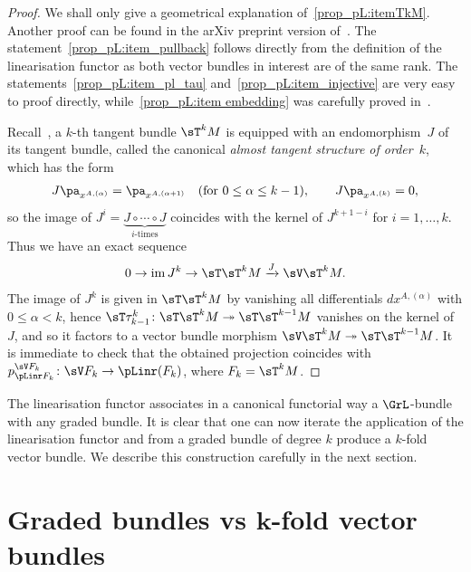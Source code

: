 \begin{proof} We shall only give a geometrical explanation of~\eqref{prop_pL:itemTkM}. Another proof can be found in the arXiv preprint version of~\cite{Bruce:2014b}. The statement~\eqref{prop_pL:item_pullback} follows directly from the def\/inition of the linearisation functor as both vector bundles in interest are of the same rank. The statements~\eqref{prop_pL:item_pl_tau} and~\eqref{prop_pL:item_injective} are very easy to proof directly, while~\eqref{prop_pL:item embedding} was carefully proved in~\cite{Bruce:2014}.

Recall~\cite{Leon:1992, Eliopoulos:1966}, a $k$-th tangent bundle $\sT^k M$ is equipped with an endomorphism~$J$ of its tangent bundle, called the canonical \emph{almost tangent structure of order~$k$}, which has the form
\begin{gather*}
J \pa_{x^{A, (\alpha)}} = \pa_{x^{A, (\alpha+1)}} \quad (\text{for}\ 0\leq \alpha\leq k-1), \qquad J \pa_{x^{A, (k)}} = 0,
\end{gather*}
so the image of $J^i=\underbrace{J\circ \cdots \circ J}_{i\text{-times}}$ coincides with the kernel of $J^{k+1-i}$ for $i=1, \ldots, k$. Thus we have an exact sequence
\begin{gather*}
0\rightarrow \operatorname{im} J^k \rightarrow \sT \sT^{k} M \xrightarrow{J} \sV \sT^k M.
\end{gather*}
The image of $J^k$ is given in $\sT \sT^{k}M$ by vanishing all dif\/ferentials $d x^{A, (\alpha)}$ with $0\leq \alpha <k$, hence $\sT \tau^k_{k-1} \colon \sT \sT^k M \twoheadrightarrow \sT\sT^{k-1} M$ vanishes on the kernel of $J$, and so it factors to a vector bundle morphism $\sV \sT^k M \twoheadrightarrow \sT \sT^{k-1} M$. It is immediate to check that the obtained projection coincides with $p^{\sV F_k}_{\pLinr F_k}\colon \sV F_k \rightarrow \pLinr(F_k)$, where $F_k=\sT^k M$.
\end{proof}

The linearisation functor associates in a canonical functorial way a $\GrL$-bundle with any graded bundle. It is clear that one can now iterate the application of the linearisation functor and from a graded bundle of degree $k$ produce a $k$-fold vector bundle. We describe this construction carefully in the next section.

\section[Graded bundles vs $k$-fold vector bundles]{Graded bundles vs $\boldsymbol{k}$-fold vector bundles}\label{sec:GradedBundlesandHigherVectorBundles}
